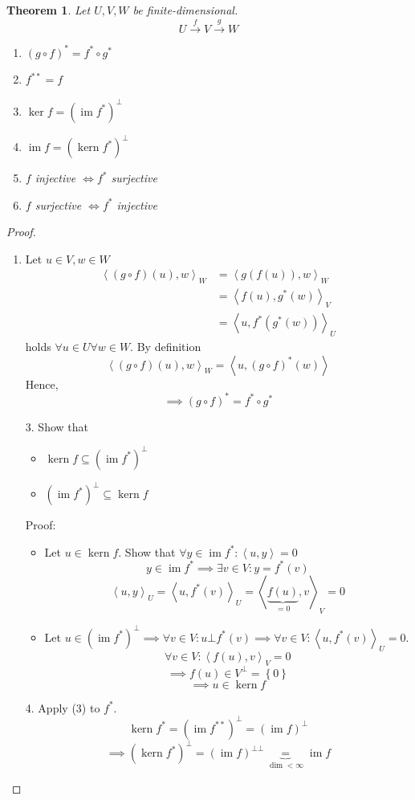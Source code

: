 \documentclass[a4paper]{article}
\newcounter{lecref}[section]
\numberwithin{lecref}{section}
\newtheorem{theorem}[lecref]{Theorem}
\newcommand{\set}[1]{\left\{#1\right\}}
\newcommand{\ip}[2]{\left\langle#1,#2\right\rangle} %
\DeclareMathOperator{\im}{im}
\DeclareMathOperator{\ke}{kern}
\begin{document}
\begin{theorem} %
  Let $U, V, W$ be finite-dimensional.
  \[ U \xrightarrow f V \xrightarrow g W \]
  \begin{enumerate}
    \item $(g \circ f)^* = f^* \circ g^*$
    \item $f^{**} = f$
    \item $\ker{f} = (\im{f^*})^\bot$
    \item $\im{f} = (\ke{f^*})^\bot$
    \item $f$ injective $\iff f^*$ surjective
    \item $f$ surjective $\iff f^*$ injective
  \end{enumerate}
\end{theorem}
\begin{proof}
  \begin{enumerate}
    \item Let $u \in V, w \in W$
      \begin{align*}
        \ip{(g \circ f)(u)}{w}_W &= \ip{g(f(u))}{w}_W \\
          &= \ip{f(u)}{g^*(w)}_V \\
          &= \ip{u}{f^*(g^*(w))}_U
      \end{align*}
      holds $\forall u \in U \forall w \in W$. By definition
      \[ \ip{(g \circ f)(u)}{w}_W = \ip{u}{(g \circ f)^*(w)} \]
      Hence,
      \[ \implies (g \circ f)^* = f^* \circ g^* \]
    \item[3.] Show that
      \begin{itemize}
        \item $\ke{f} \subseteq (\im{f^*})^\bot$
        \item $(\im{f^*})^\bot \subseteq \ke{f}$
      \end{itemize}
      Proof:
      \begin{itemize}
        \item Let $u \in \ke{f}$. Show that $\forall y \in \im{f^*}: \ip uy = 0$
          \[ y \in \im{f^*} \implies \exists v \in V: y = f^*(v) \]
          \[ {\ip uy}_U = \ip{u}{f^*(v)}_U = \ip{\underbrace{f(u)}_{=0}}{v}_V = 0 \]
        \item Let $u \in (\im{f^*})^\bot \implies \forall v \in V: u \bot f^*(v) \implies
          \forall v \in V: \ip{u}{f^*(v)}_U = 0$.
          \[ \forall v \in V: \ip{f(u)}{v}_V = 0 \]
          \[ \implies f(u) \in V^\bot = \set{0} \]
          \[ \implies u \in \ke{f} \]
      \end{itemize}
    \item[4.]
      Apply (3) to $f^*$.
      \[ \ke{f^*} = (\im{f^{**}})^\bot = (\im{f})^\bot \]
      \[ \implies \left(\ke{f^*}\right)^\bot = (\im{f})^{\bot\bot} \underbrace{=}_{\dim < \infty} \im{f} \]
  \end{enumerate}
\end{proof}
\end{document}
